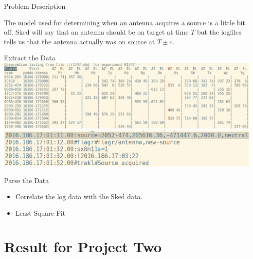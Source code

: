 \documentclass{beamer}
\begin{document}
    \begin{frame}{Problem Description}

        The model used for determining when an antenna acquires a source is a
        little bit off. Sked will say that an antenna should be on target at
        time $T$ but the logfiles tells us that the antenna actually was on
        source at $T \pm c$.
    \end{frame}
    \begin{frame}{Extract the Data}
        \centering
        \includegraphics[width=1\columnwidth]{skds}\\[2ex]
        \includegraphics[width=0.75\columnwidth]{logs}
    \end{frame}
    \begin{frame}{Parse the Data}
        \begin{itemize}[<+-|alert@+>]
            \item Correlate the log data with the Sked data.
            \item Least Square Fit
        \end{itemize}
    \end{frame}


    \section{Result for Project Two}

\end{document}
